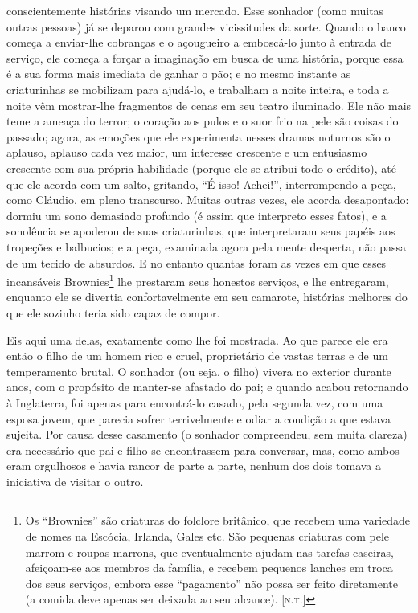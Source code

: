 conscientemente histórias visando um mercado.  Esse sonhador (como
muitas outras pessoas) já se deparou com grandes vicissitudes da sorte.
 Quando o banco começa a enviar-lhe cobranças e o açougueiro a
emboscá-lo junto à entrada de serviço, ele começa a forçar a imaginação
em busca de uma história, porque essa é a sua forma mais imediata de
ganhar o pão; e no mesmo instante as criaturinhas se mobilizam para
ajudá-lo, e trabalham a noite inteira, e toda a noite vêm mostrar-lhe
fragmentos de cenas em seu teatro iluminado.  Ele não mais teme a
ameaça do terror; o coração aos pulos e o suor frio na pele são coisas
do passado; agora, as emoções que ele experimenta nesses dramas
noturnos são o aplauso, aplauso cada vez maior, um interesse crescente
e um entusiasmo crescente com sua própria habilidade (porque ele se
atribui todo o crédito), até que ele acorda com um salto, gritando, “É
isso!  Achei!”, interrompendo a peça, como Cláudio, em pleno
transcurso.  Muitas outras vezes, ele acorda desapontado: dormiu um
sono demasiado profundo (é assim que interpreto esses fatos), e a
sonolência se apoderou de suas criaturinhas, que interpretaram seus
papéis aos tropeções e balbucios; e a peça, examinada agora pela mente
desperta, não passa de um tecido de absurdos.  E no entanto quantas
foram as vezes em que esses incansáveis Brownies\footnote{Os “Brownies”
são criaturas do folclore britânico, que
recebem uma variedade de nomes na Escócia, Irlanda, Gales etc. São pequenas
criaturas com pele marrom e roupas marrons, que eventualmente ajudam nas
tarefas caseiras, afeiçoam-se aos membros da família, e recebem pequenos
lanches em troca dos seus serviços, embora esse “pagamento” não possa ser feito
diretamente (a comida deve apenas ser deixada ao seu alcance).
[\textsc{n.t.}]} lhe prestaram seus
honestos serviços, e lhe entregaram, enquanto ele se divertia
confortavelmente em seu camarote, histórias melhores do que ele sozinho
teria sido capaz de compor. 

Eis aqui uma delas, exatamente como lhe foi mostrada.  Ao que parece ele
era então o filho de um homem rico e cruel, proprietário de vastas
terras e de um temperamento brutal.  O sonhador (ou seja, o filho)
vivera no exterior durante anos, com o propósito de manter-se afastado
do pai; e quando acabou retornando à Inglaterra, foi apenas para
encontrá-lo casado, pela segunda vez, com uma esposa jovem, que parecia
sofrer terrivelmente e odiar a condição a que estava sujeita.  Por
causa desse casamento (o sonhador compreendeu, sem muita clareza) era
necessário que pai e filho se encontrassem para conversar, mas, como
ambos eram orgulhosos e havia rancor de parte a parte, nenhum dos dois
tomava a iniciativa de visitar o outro.

